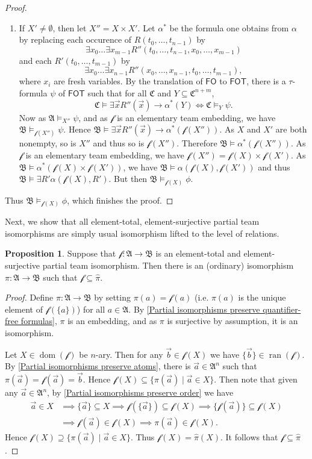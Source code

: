 \documentclass[a4paper]{amsart}
\theoremstyle{definition}
\newtheorem{proposition}[definition]{Proposition}
\theoremstyle{remark}
\newcommand{\A}{\mathcal{A}}
\newcommand{\B}{\mathcal{B}}
\newcommand{\C}{\mathcal{C}}
\newcommand{\vx}{\vec{x}}
\DeclareMathOperator{\dom}{dom}
\DeclareMathOperator{\ran}{ran}
\newcommand\fol{\mathsf{FO}}
\newcommand\fot{\mathsf{FOT}}
\theoremstyle{definition}
\renewcommand{\A}{\mathfrak{A}}
\renewcommand{\B}{\mathfrak{B}}
\renewcommand{\C}{\mathfrak{C}}
\newcommand{\f}{\mathcal{f}}
\begin{document}
\begin{proof}
\begin{enumerate}
        \item If $X'\neq\emptyset$, then let $X'' = X\times X'$. Let $\alpha^*$ be the formula one obtains from $\alpha$ by replacing each occurence of $R(t_0,\dots,t_{n-1})$ by
        \[
            \exists x_0\dots\exists x_{m-1}R''(t_0,\dots,t_{n-1},x_0,\dots,x_{m-1})
        \]
        and each $R'(t_0,\dots,t_{m-1})$ by
        \[
            \exists x_0\dots\exists x_{n-1}R''(x_0,\dots,x_{n-1},t_0,\dots,t_{m-1}),
        \]
        where $x_i$ are fresh variables. By the translation of $\fol$ to $\fot$, there is a $\tau$-formula $\psi$ of $\fot$ such that for all $\C$ and $Y\subseteq\C^{n+m}$,
        \[
            \C\models\exists\vx R''(\vx)\to\alpha^*(Y) \iff \C\models_Y\psi.
        \]
        Now  as $\A\models_{X''}\psi$, and as $\f$ is an elementary team embedding, we have $\B\models_{\f(X'')}\psi$. Hence $\B\models\exists\vx R''(\vx)\to\alpha^*(\f(X''))$. As $X$ and $X'$ are both nonempty, so is $X''$ and thus so is $\f(X'')$. Therefore $\B\models\alpha^*(\f(X''))$. As $\f$ is an elementary team embedding, we have $\f(X'') = \f(X)\times\f(X')$. As $\B\models\alpha^*(\f(X)\times\f(X'))$, we have $\B\models\alpha(\f(X),\f(X'))$ and thus $\B\models\exists R'\alpha(\f(X), R')$. But then $\B\models_{\f(X)}\phi$.
    \end{enumerate}
    Thus $\B\models_{\f(X)}\phi$, which finishes the proof.
\end{proof}

Next, we show that all element-total, element-surjective partial team isomorphisms are simply usual isomorphism lifted to the level of relations.


\begin{proposition}\label{extension.of.isomorphisms}
    Suppose that $\f\colon\A\to\B$ is an element-total and element-surjective partial team isomorphism. Then there is an (ordinary) isomorphism $\pi\colon\A\to\B$ such that $\f \subseteq \hat\pi$.
\end{proposition}
\begin{proof}
    Define $\pi\colon\A\to\B$ by setting $\pi(a) = \f(a)$ (i.e. $\pi(a)$ is the unique element of $\f(\{a\})$) for all $a\in\A$. By \cref{Partial isomorphisms preserve quantifier-free formulas}, $\pi$ is an embedding, and as $\pi$ is surjective by assumption, it is an isomorphism.
    
    Let $X\in\dom(\f)$ be $n$-ary. Then for any $\vec b\in \f(X)$ we have $\{\vec b\}\in\ran(\f)$. By \ref{Partial isomorphisms preserve atoms}, there is $\vec a\in\A^n$ such that $\pi(\vec a) = \f(\vec a) = \vec b$. Hence $\f(X)\subseteq\{\pi(\vec a) \mid \vec a\in X\}$. Then note that given any $\vec a\in\A^n$, by \ref{Partial isomorphisms preserve order} we have
    \begin{align*}
        \vec a\in X &\implies \{\vec a\} \subseteq X \implies \f(\{\vec a\})\subseteq \f(X) \implies \{\f(\vec a)\}\subseteq \f(X) \\
        &\implies \f(\vec a)\in \f(X) \implies \pi(\vec a)\in \f(X).
    \end{align*}
    Hence $\f(X) \supseteq \{\pi(\vec a) \mid \vec a\in X \}$. Thus $\f(X) = \hat\pi(X)$. It follows that $\f\subseteq\hat\pi$.
\end{proof}
\end{document}
